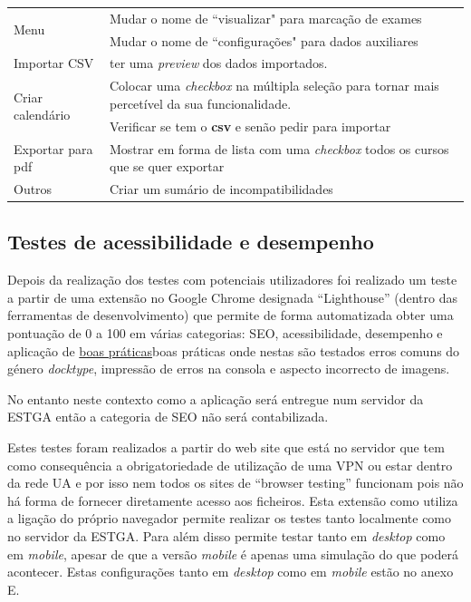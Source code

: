 \documentclass[11pt, twoside]{report}
\begin{document}
\begin{center}
\begin{longtable}{|m{2.2cm}|m{12cm}|}
			\hline
			
			\multirow{2}{2cm}{Menu} &Mudar o nome de ``visualizar" para marcação de exames\\
			&Mudar o nome de ``configurações" para dados auxiliares\\
			\hline
			Importar CSV & ter uma \textit{preview} dos dados importados.\\
			\hline
			\multirow{2}{2cm}{Criar calendário} & Colocar uma \textit{checkbox} na múltipla seleção para tornar mais percetível da sua funcionalidade.\\
			& Verificar se tem o \textbf{csv} e senão pedir para importar\\
			\hline
			Exportar para pdf & Mostrar em forma de lista com uma \textit{checkbox} todos os cursos que se quer exportar\\
			\hline
			Outros & Criar um sumário de incompatibilidades\\
			\hline
		\end{longtable}
	\end{center}
	
	\subsection{Testes de acessibilidade e desempenho}
	
	Depois da realização dos testes com potenciais utilizadores foi realizado um teste a partir de uma extensão no Google Chrome designada ``Lighthouse'' (dentro das ferramentas de desenvolvimento) que permite de forma automatizada obter uma pontuação de 0 a 100 em várias categorias: SEO, acessibilidade, desempenho e aplicação de \href{https://web.dev/lighthouse-best-practices/}{boas práticas}boas práticas onde nestas são testados erros comuns do género \textit{docktype}, impressão de erros na consola e aspecto incorrecto de imagens.
	
	No entanto neste contexto como a aplicação será entregue num servidor da ESTGA então a categoria de SEO não será contabilizada. 
	
	Estes testes foram realizados a partir do web site que está no servidor que tem como consequência a obrigatoriedade de utilização de uma VPN ou estar dentro da rede UA e por isso nem todos os sites de ``browser testing'' funcionam pois não há forma de fornecer diretamente acesso aos ficheiros.
	Esta extensão como utiliza a ligação do próprio navegador permite realizar os testes tanto localmente como no servidor da ESTGA.
	Para além disso permite testar tanto em \textit{desktop} como em \textit{mobile}, apesar de que a versão \textit{mobile} é apenas uma simulação do que poderá acontecer. Estas configurações tanto em \textit{desktop} como em \textit{mobile} estão no anexo E. 
	
\end{document}
